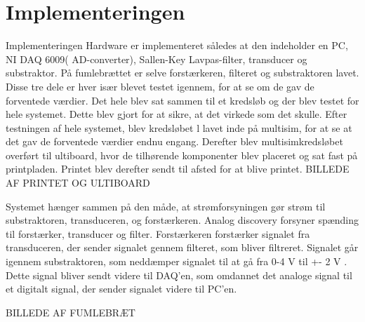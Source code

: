\chapter{Implementeringen}
Implementeringen
Hardware er implementeret således at den indeholder en PC, NI DAQ 6009( AD-converter), Sallen-Key Lavpas-filter, transducer og substraktor. På fumlebrættet er selve forstærkeren, filteret og substraktoren lavet. Disse tre dele er hver især blevet testet igennem, for at se om de gav de forventede værdier. Det hele blev sat sammen til et kredsløb og der blev testet for hele systemet. Dette blev gjort for at sikre, at det virkede som det skulle. Efter testningen af hele systemet, blev kredsløbet l lavet inde på multisim, for at se at det gav de forventede værdier endnu engang. Derefter blev multisimkredsløbet overført til ultiboard, hvor de tilhørende komponenter blev placeret og sat fast på printpladen.  Printet blev derefter sendt til afsted for at blive printet.
BILLEDE AF PRINTET OG ULTIBOARD

Systemet hænger sammen på den måde, at strømforsyningen gør strøm til substraktoren, transduceren,  og forstærkeren. Analog discovery forsyner spænding til forstærker, transducer og filter. Forstærkeren forstærker signalet fra transduceren, der sender signalet gennem filteret, som bliver filtreret. Signalet går igennem substraktoren, som neddæmper signalet til at gå fra 0-4 V til +- 2 V . Dette signal bliver sendt videre til DAQ’en, som omdannet det analoge signal til et digitalt signal, der sender signalet videre til PC’en. 

BILLEDE AF FUMLEBRÆT


